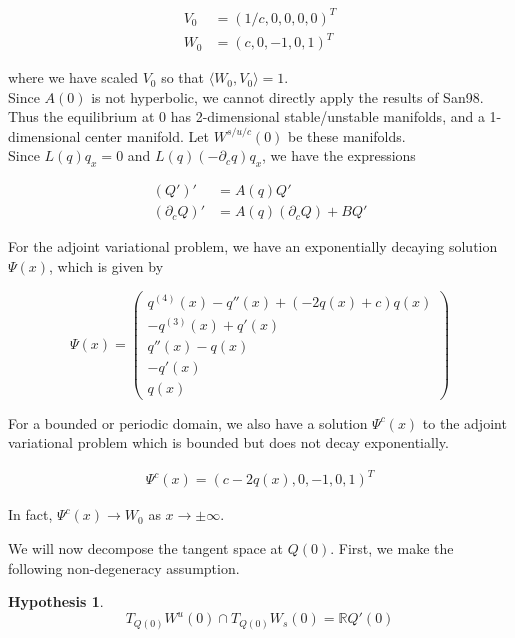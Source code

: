 \documentclass[12pt]{article}
\def\R{{\mathbb R}}
\newtheorem{hypothesis}{Hypothesis}
\begin{document}
\begin{align*}
V_0 &= (1/c, 0, 0, 0, 0)^T \\
W_0 &= (c, 0, -1, 0, 1)^T 
\end{align*}

where we have scaled $V_0$ so that $\langle W_0, V_0 \rangle = 1$.\\

Since $A(0)$ is not hyperbolic, we cannot directly apply the results of San98. Thus the equilibrium at 0 has 2-dimensional stable/unstable manifolds, and a 1-dimensional center manifold. Let $W^{s/u/c}(0)$ be these manifolds.\\

Since $L(q)q_x = 0$ and $L(q)(-\partial_c q) q_x$, we have the expressions

\begin{align*}
(Q')' &= A(q) Q' \\
(\partial_c Q)' &= A(q) (\partial_c Q) + B Q'
\end{align*}

For the adjoint variational problem, we have an exponentially decaying solution $\Psi(x)$, which is given by

\begin{equation}\label{Psi}
\Psi(x) = \begin{pmatrix}
q^{(4)}(x) - q''(x) + (-2q(x) + c)q(x)\\
-q^{(3)}(x) + q'(x) \\
q''(x) - q(x) \\
-q'(x) \\
q(x)
\end{pmatrix}
\end{equation}

For a bounded or periodic domain, we also have a solution $\Psi^c(x)$ to the adjoint variational problem which is bounded but does not decay exponentially.

\begin{align*}
\Psi^c(x) = (c - 2 q(x), 0, -1, 0, 1)^T
\end{align*}

In fact, $\Psi^c(x) \rightarrow W_0$ as $x \rightarrow \pm \infty$.

We will now decompose the tangent space at $Q(0)$. First, we make the following non-degeneracy assumption.

\begin{hypothesis}\label{nondegen}
\[
T_{Q(0)} W^u(0) \cap T_{Q(0)} W_s(0) = \R Q'(0)
\]
\end{hypothesis}
\end{document}
